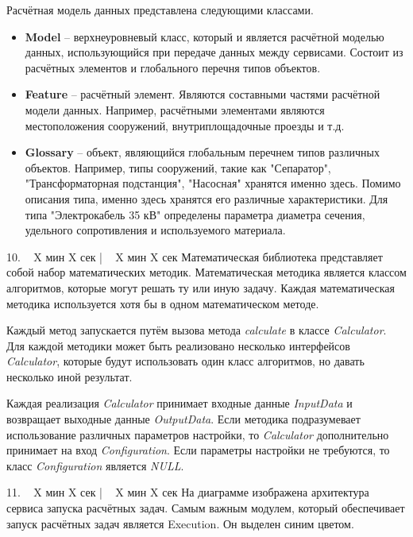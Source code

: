 \documentclass[a4paper,14pt]{extarticle}
\begin{document}
    Расчётная модель данных представлена следующими классами.
    \begin{itemize}
        \item \textbf{Model} -- верхнеуровневый класс, который и является расчётной моделью данных, использующийся
        при передаче данных между сервисами. Состоит из расчётных элементов и глобального перечня типов объектов.
        \item {
            \textbf{Feature} -- расчётный элемент. Являются составными частями расчётной модели данных.
            Например, расчётными
            элементами являются местоположения сооружений, внутриплощадочные проезды и т.д.
        }
        \item {
            \textbf{Glossary} -- объект, являющийся глобальным перечнем типов различных объектов.
            Например, типы сооружений, такие как "Сепаратор", "Трансформаторная подстанция", "Насосная" хранятся именно
            здесь. Помимо описания типа, именно здесь хранятся его различные характеристики. Для типа "Электрокабель 35 кВ"
            определены параметра диаметра сечения, удельного сопротивления и используемого материала.
        }
    \end{itemize}

    10. ~ X мин X сек | ~ X мин X сек
    Математическая библиотека представляет собой набор математических методик.
    Математическая методика является классом алгоритмов, которые могут решать ту или иную задачу.
    Каждая математическая методика используется хотя бы в одном математическом методе.

    Каждый метод запускается путём вызова метода \textit{calculate}
    в классе \textit{Calculator}.
    Для каждой методики может быть реализовано несколько интерфейсов \textit{Calculator},
    которые будут использовать один класс алгоритмов, но давать несколько иной результат.

    Каждая реализация \textit{Calculator} принимает входные данные \textit{InputData}
    и возвращает выходные данные \textit{OutputData}.
    Если методика подразумевает использование различных параметров настройки, то \textit{Calculator} дополнительно
    принимает на вход \textit{Configuration}. Если параметры настройки не требуются, то класс \textit{Configuration}
    является \textit{NULL}.

    11. ~ X мин X сек | ~ X мин X сек
    На диаграмме изображена архитектура сервиса запуска расчётных задач.
    Самым важным модулем, который обеспечивает запуск расчётных задач является Execution. Он выделен синим цветом.
\end{document}
